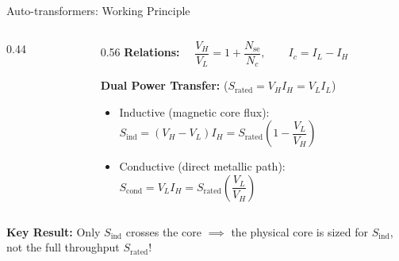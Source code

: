 \begin{frame}{Auto-transformers: Working Principle}
\begin{columns}[c]
\begin{column}{0.44\textwidth}
    \end{column}
    \begin{column}{0.56\textwidth}
        \small
        \textbf{Relations:} $\quad\dfrac{V_H}{V_L} = 1 + \dfrac{N_{\text{se}}}{N_c}, \qquad I_c = I_L - I_H$
        
        \vspace{0.15cm}
        \textbf{Dual Power Transfer:} ($S_{\text{rated}} = V_H I_H = V_L I_L$)
        \begin{itemize}\setlength{\itemsep}{4pt}
            \item \alert{Inductive} (magnetic core flux):\\
            $S_{\text{ind}} = (V_H - V_L)I_H = S_{\text{rated}}\left(1 - \dfrac{V_L}{V_H}\right)$
            \item \alert{Conductive} (direct metallic path):\\
            $S_{\text{cond}} = V_L I_H = S_{\text{rated}}\left(\dfrac{V_L}{V_H}\right)$
        \end{itemize}
    \end{column}
\end{columns}

\vspace{0.2cm}
\footnotesize
\alert{\textbf{Key Result:}} Only $S_{\text{ind}}$ crosses the core $\implies$ the physical core is sized for $S_{\text{ind}}$, not the full throughput $S_{\text{rated}}$!
\end{frame}

